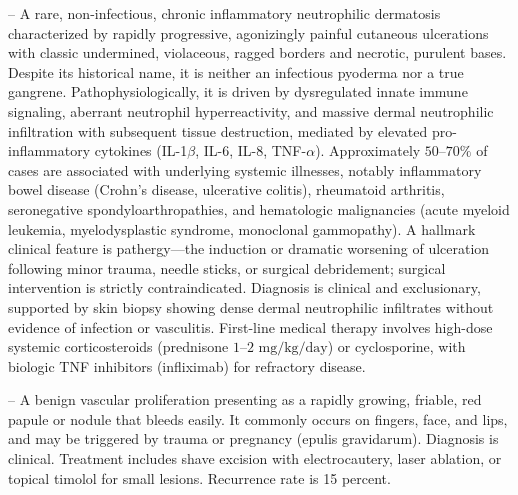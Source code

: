 -- A rare, non-infectious, chronic inflammatory neutrophilic dermatosis characterized by rapidly progressive, agonizingly painful cutaneous ulcerations with classic undermined, violaceous, ragged borders and necrotic, purulent bases. Despite its historical name, it is neither an infectious pyoderma nor a true gangrene. Pathophysiologically, it is driven by dysregulated innate immune signaling, aberrant neutrophil hyperreactivity, and massive dermal neutrophilic infiltration with subsequent tissue destruction, mediated by elevated pro-inflammatory cytokines (IL-1$\beta$, IL-6, IL-8, TNF-$\alpha$). Approximately $50\text{--}70\%$ of cases are associated with underlying systemic illnesses, notably inflammatory bowel disease (Crohn's disease, ulcerative colitis), rheumatoid arthritis, seronegative spondyloarthropathies, and hematologic malignancies (acute myeloid leukemia, myelodysplastic syndrome, monoclonal gammopathy). A hallmark clinical feature is pathergy---the induction or dramatic worsening of ulceration following minor trauma, needle sticks, or surgical debridement; surgical intervention is strictly contraindicated. Diagnosis is clinical and exclusionary, supported by skin biopsy showing dense dermal neutrophilic infiltrates without evidence of infection or vasculitis. First-line medical therapy involves high-dose systemic corticosteroids (prednisone $1\text{--}2\text{ mg/kg/day}$) or cyclosporine, with biologic TNF inhibitors (infliximab) for refractory disease.

-- A benign vascular proliferation presenting as a rapidly growing, friable, red papule or nodule that bleeds easily. It commonly occurs on fingers, face, and lips, and may be triggered by trauma or pregnancy (epulis gravidarum). Diagnosis is clinical. Treatment includes shave excision with electrocautery, laser ablation, or topical timolol for small lesions. Recurrence rate is 15 percent.

